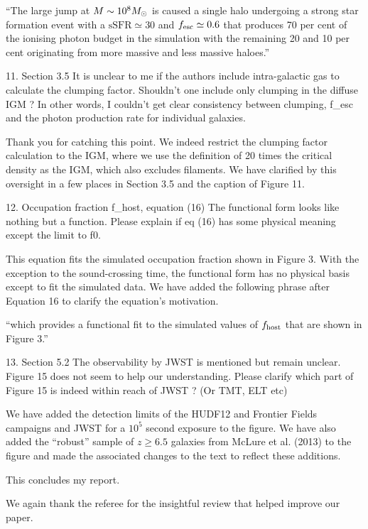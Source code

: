 \documentclass[11pt]{article}
\begin{document}
``The large jump at $M \sim 10^8 \Ms$ is caused a single halo
undergoing a strong star formation event with a $\textrm{sSFR} \simeq
30$ and $\fesc \simeq 0.6$ that produces 70 per cent of the ionising
photon budget in the simulation with the remaining 20 and 10 per cent
originating from more massive and less massive haloes.''
 
\begin{referee}
11. Section 3.5
It is unclear to me if the authors include intra-galactic
gas to calculate the clumping factor. Shouldn't one
include only clumping in the diffuse IGM ?
In other words, I couldn't get clear consistency between
clumping, f_esc and the photon production rate for
individual galaxies.
\end{referee}

Thank you for catching this point.  We indeed restrict the clumping
factor calculation to the IGM, where we use the definition of 20 times
the critical density as the IGM, which also excludes filaments.  We
have clarified by this oversight in a few places in Section 3.5 and
the caption of Figure 11.
 
\begin{referee}
12. Occupation fraction f_host, equation (16)
The functional form looks like nothing but a function.
Please explain if eq (16) has some physical meaning
except the limit to f0.
\end{referee}

This equation fits the simulated occupation fraction shown in Figure
3.  With the exception to the sound-crossing time, the functional form
has no physical basis except to fit the simulated data.  We have added
the following phrase after Equation 16 to clarify the equation's
motivation.

``which provides a functional fit to the simulated values of $f_{\rm
host}$ that are shown in Figure 3.''

\begin{referee}
13. Section 5.2
The observability by JWST is mentioned but remain
unclear. Figure 15 does not seem to help our
understanding. Please clarify which part of Figure 15
is indeed within reach of JWST ? (Or TMT, ELT etc)
\end{referee}

We have added the detection limits of the HUDF12 and Frontier Fields
campaigns and JWST for a $10^5$ second exposure to the figure.  We have
also added the ``robust'' sample of $z \ge 6.5$ galaxies from McLure et
al. (2013) to the figure and made the associated changes to the text
to reflect these additions.

\begin{referee}
This concludes my report.
\end{referee}

We again thank the referee for the insightful review that helped
improve our paper.
\end{document}
